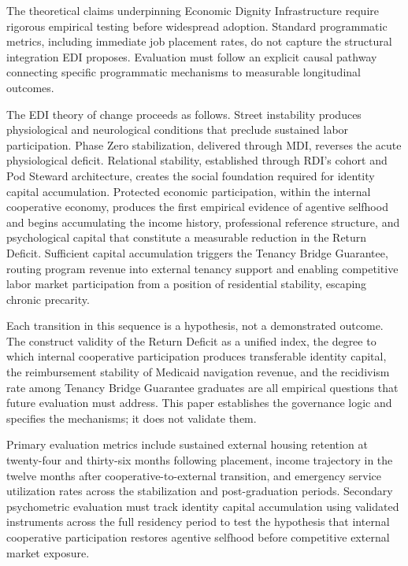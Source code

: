 \documentclass[12pt, letterpaper]{article}
\begin{document}
The theoretical claims underpinning Economic Dignity Infrastructure require rigorous empirical testing before widespread adoption. Standard programmatic metrics, including immediate job placement rates, do not capture the structural integration EDI proposes. Evaluation must follow an explicit causal pathway connecting specific programmatic mechanisms to measurable longitudinal outcomes.

The EDI theory of change proceeds as follows. Street instability produces physiological and neurological conditions that preclude sustained labor participation. Phase Zero stabilization, delivered through MDI, reverses the acute physiological deficit. Relational stability, established through RDI's cohort and Pod Steward architecture, creates the social foundation required for identity capital accumulation. Protected economic participation, within the internal cooperative economy, produces the first empirical evidence of agentive selfhood and begins accumulating the income history, professional reference structure, and psychological capital that constitute a measurable reduction in the Return Deficit. Sufficient capital accumulation triggers the Tenancy Bridge Guarantee, routing program revenue into external tenancy support and enabling competitive labor market participation from a position of residential stability, escaping chronic precarity.

Each transition in this sequence is a hypothesis, not a demonstrated outcome. The construct validity of the Return Deficit as a unified index, the degree to which internal cooperative participation produces transferable identity capital, the reimbursement stability of Medicaid navigation revenue, and the recidivism rate among Tenancy Bridge Guarantee graduates are all empirical questions that future evaluation must address. This paper establishes the governance logic and specifies the mechanisms; it does not validate them.

Primary evaluation metrics include sustained external housing retention at twenty-four and thirty-six months following placement, income trajectory in the twelve months after cooperative-to-external transition, and emergency service utilization rates across the stabilization and post-graduation periods. Secondary psychometric evaluation must track identity capital accumulation using validated instruments across the full residency period to test the hypothesis that internal cooperative participation restores agentive selfhood before competitive external market exposure.
\end{document}
